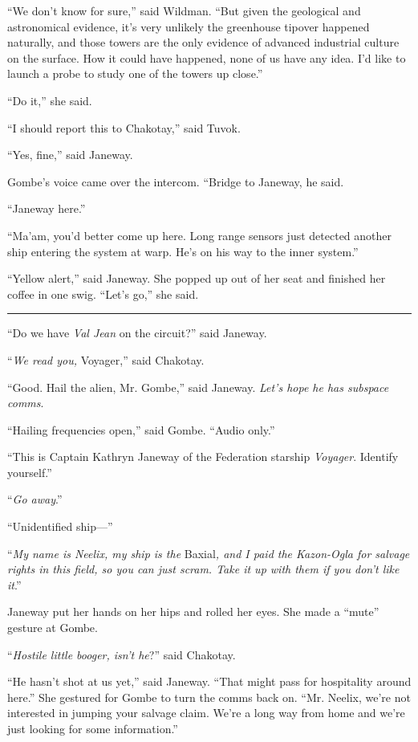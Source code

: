 \documentclass[twoside,letterpaper,12pt]{memoir}
\begin{document}
``We don't know for sure,'' said Wildman. ``But given the geological and astronomical evidence, it’s very unlikely the greenhouse tipover happened naturally, and those towers are the only evidence of advanced industrial culture on the surface. How it could have happened, none of us have any idea. I’d like to launch a probe to study one of the towers up close.''

``Do it,'' she said.

``I should report this to Chakotay,'' said Tuvok.

``Yes, fine,'' said Janeway.

Gombe's voice came over the intercom. ``Bridge to Janeway, he said.

``Janeway here.''

``Ma'am, you'd better come up here. Long range sensors just detected another ship entering the system at warp. He's on his way to the inner system.''

``Yellow alert,'' said Janeway. She popped up out of her seat and finished her coffee in one swig. ``Let's go,'' she said.

\fancybreak{\rule{3cm}{0.4 pt}}
``Do we have \textit{Val Jean} on the circuit?'' said Janeway.

``\textit{We read you, }Voyager,'' said Chakotay.

``Good. Hail the alien, Mr. Gombe,'' said Janeway. \textit{Let's hope he has subspace comms}.

``Hailing frequencies open,'' said Gombe. ``Audio only.''

``This is Captain Kathryn Janeway of the Federation starship \textit{Voyager}. Identify yourself.''

``\textit{Go away}.''

``Unidentified ship---''

``\textit{My name is Neelix, my ship is the }Baxial\textit{, and I paid the Kazon-Ogla for salvage rights in this field, so you can just scram. Take it up with them if you don't like it}.''

Janeway put her hands on her hips and rolled her eyes. She made a ``mute'' gesture at Gombe.

``\textit{Hostile little booger, isn't he}?'' said Chakotay.

``He hasn't shot at us yet,'' said Janeway. ``That might pass for hospitality around here.'' She gestured for Gombe to turn the comms back on. ``Mr. Neelix, we're not interested in jumping your salvage claim. We're a long way from home and we're just looking for some information.''
\end{document}
